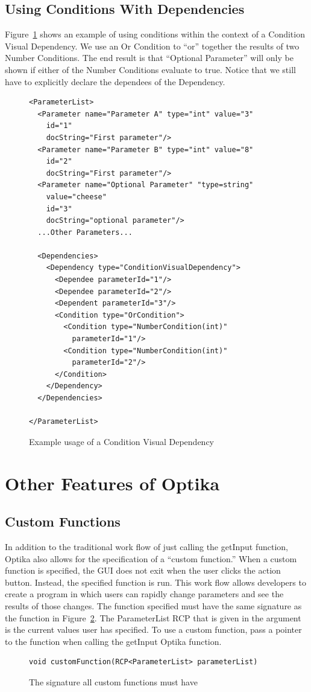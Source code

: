 \subsection{Using Conditions With Dependencies}
Figure~\ref{conVisDep} shows an example of using conditions within the context of a Condition Visual Dependency.
We use an Or Condition to ``or'' together the results of two Number Conditions. The end result is that ``Optional Parameter'' 
will only be shown if either of the Number Conditions evaluate to true. Notice that we still have to explicitly declare
the dependees of the Dependency.
\begin{figure}
\centering
{\footnotesize
\begin{Verbatim}
<ParameterList>
  <Parameter name="Parameter A" type="int" value="3"
    id="1"
    docString="First parameter"/>
  <Parameter name="Parameter B" type="int" value="8"
    id="2"
    docString="First parameter"/>
  <Parameter name="Optional Parameter" "type=string"
    value="cheese"
    id="3"
    docString="optional parameter"/>
  ...Other Parameters...

  <Dependencies>
    <Dependency type="ConditionVisualDependency">
      <Dependee parameterId="1"/>
      <Dependee parameterId="2"/>
      <Dependent parameterId="3"/>
      <Condition type="OrCondition">
        <Condition type="NumberCondition(int)" 
          parameterId="1"/>
        <Condition type="NumberCondition(int)"
          parameterId="2"/>
      </Condition>
    </Dependency>
  </Dependencies>

</ParameterList>
\end{Verbatim}
}
\caption{Example usage of a Condition Visual Dependency}
\label{conVisDep}
\end{figure}

\section{Other Features of Optika}
\subsection{Custom Functions}
In addition to the traditional work flow of just calling the getInput function, Optika also allows for the specification of a ``custom function.''
When a custom function is specified, the GUI does not exit when the user clicks the action button. Instead, the specified function is run. This work flow allows developers 
to create a program in which users can rapidly change parameters and see the results of those changes. The function specified must have the same signature as the function 
in Figure~\ref{custSig}. The ParameterList RCP that is given in the argument is the current values user has specified. To use a custom function, pass a pointer to the
function when calling the getInput Optika function.
\begin{figure}
\centering
{\footnotesize
\begin{Verbatim}
void customFunction(RCP<ParameterList> parameterList)
\end{Verbatim}
}
\caption{The signature all custom functions must have}
\label{custSig}
\end{figure}

